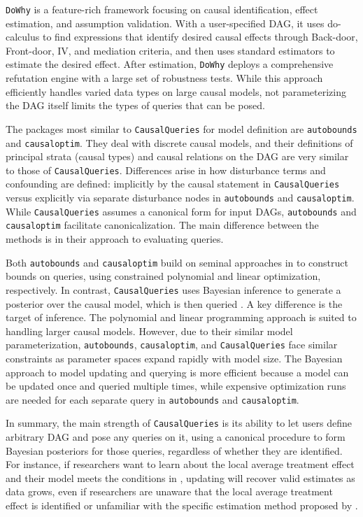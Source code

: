 \documentclass[
  11pt,
  article]{jss}
\begin{document}
\texttt{DoWhy} is a feature-rich framework focusing on causal
identification, effect estimation, and assumption validation. With a
user-specified DAG, it uses do-calculus to find expressions that
identify desired causal effects through Back-door, Front-door, IV, and
mediation criteria, and then uses standard estimators to estimate the
desired effect. After estimation, \texttt{DoWhy} deploys a comprehensive
refutation engine with a large set of robustness tests. While this
approach efficiently handles varied data types on large causal models,
not parameterizing the DAG itself limits the types of queries that can
be posed.

The packages most similar to \texttt{CausalQueries} for model definition
are \texttt{autobounds} and \texttt{causaloptim}. They deal with
discrete causal models, and their definitions of principal strata
(causal types) and causal relations on the DAG are very similar to those
of \texttt{CausalQueries}. Differences arise in how disturbance terms
and confounding are defined: implicitly by the causal statement in
\texttt{CausalQueries} versus explicitly via separate disturbance nodes
in \texttt{autobounds} and \texttt{causaloptim}. While
\texttt{CausalQueries} assumes a canonical form for input DAGs,
\texttt{autobounds} and \texttt{causaloptim} facilitate
canonicalization. The main difference between the methods is in their
approach to evaluating queries.

Both \texttt{autobounds} and \texttt{causaloptim} build on seminal
approaches in \citet{balke_bounds_1997} to construct bounds on queries,
using constrained polynomial and linear optimization, respectively. In
contrast, \texttt{CausalQueries} uses Bayesian inference to generate a
posterior over the causal model, which is then queried \citep[consistent
with][]{chickering_clinicians_1996, zhang_partial_2022}. A key
difference is the target of inference. The polynomial and linear
programming approach is suited to handling larger causal models.
However, due to their similar model parameterization,
\texttt{autobounds}, \texttt{causaloptim}, and \texttt{CausalQueries}
face similar constraints as parameter spaces expand rapidly with model
size. The Bayesian approach to model updating and querying is more
efficient because a model can be updated once and queried multiple
times, while expensive optimization runs are needed for each separate
query in \texttt{autobounds} and \texttt{causaloptim}.

In summary, the main strength of \texttt{CausalQueries} is its ability
to let users define arbitrary DAG and pose any queries on it, using a
canonical procedure to form Bayesian posteriors for those queries,
regardless of whether they are identified. For instance, if researchers
want to learn about the local average treatment effect and their model
meets the conditions in \citet{angrist_identification_1996}, updating
will recover valid estimates as data grows, even if researchers are
unaware that the local average treatment effect is identified or
unfamiliar with the specific estimation method proposed by
\citet{angrist_identification_1996}.
\end{document}
